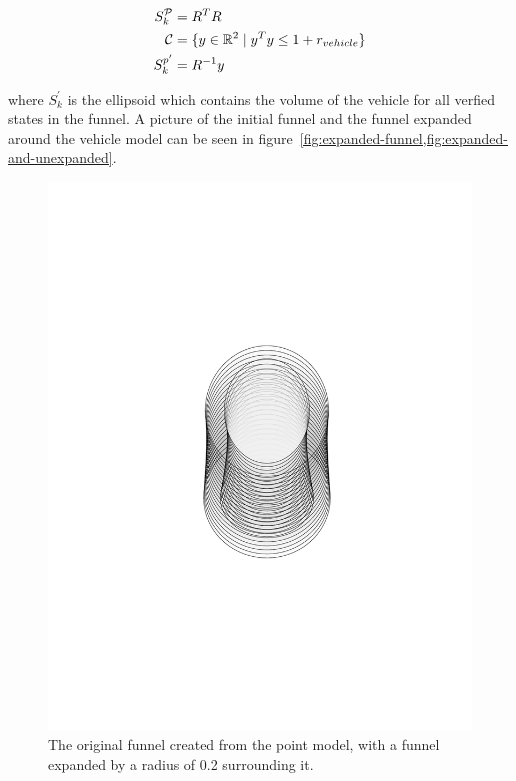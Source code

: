 \begin{align*}
  S_{k}^{\mathcal{P}} &= R^{T}R \\
  \mathcal{C} &= \lbrace y \in \mathbb{R}^2 \mid y^{T}y \leq 1 + r_{vehicle}\rbrace \\
  S_{k}^{p'} &= R^{-1}y \\
\end{align*}

where \(S_{k}^{'}\) is the ellipsoid which contains the volume of the vehicle
for all verfied states in the funnel. A picture of the initial funnel and the
funnel expanded around the vehicle model can be seen in
figure~\cref{fig:expanded-funnel,fig:expanded-and-unexpanded}.

\begin{figure}
  \centering \includegraphics[clip, trim=6cm 8cm 6cm 8cm,
  scale=.5]{figures/method/expanded-funnel}
  \caption{The original funnel created from the point model, with a funnel
    expanded by a radius of 0.2 surrounding it.}
  \label{fig:expanded-funnel}
\end{figure}

